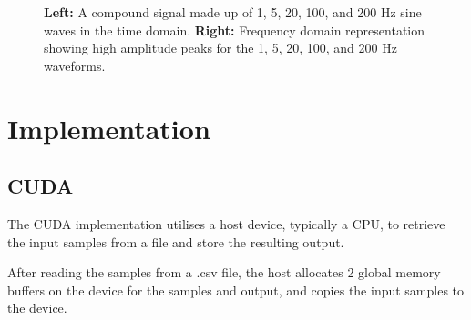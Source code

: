 \documentclass[11pt,a4paper]{article}
\begin{document}
\begin{figure}[H]%
    \centering
    \qquad
    \vspace{5pt}
    \caption{\textbf{Left:} A compound signal made up of 1, 5, 20, 100, and 200 Hz sine waves in the time domain. \textbf{Right:} Frequency domain representation showing high amplitude peaks for the 1, 5, 20, 100, and 200 Hz waveforms.}%
    \label{fig:gridwatch}%
\end{figure}

\section{Implementation}

\subsection{CUDA}
The CUDA implementation utilises a host device, typically a CPU, to retrieve the input samples from a file and store the resulting output. 

After reading the samples from a .csv file, the host allocates 2 global memory buffers on the device for the samples and output, and copies the input samples to the device. 
\end{document}
